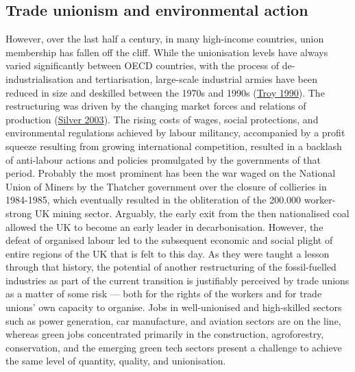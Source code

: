 \documentclass[a4paper, nobind]{templates/ociamthesis}
\begin{document}
\hypertarget{trade-unionism-and-environmental-action}{%
\subsection{Trade unionism and environmental action}\label{trade-unionism-and-environmental-action}}

However, over the last half a century, in many high-income countries, union membership has fallen off the cliff. While the unionisation levels have always varied significantly between OECD countries, with the process of de-industrialisation and tertiarisation, large-scale industrial armies have been reduced in size and deskilled between the 1970s and 1990s (\protect\hyperlink{ref-troy_us_1990}{Troy 1990}). The restructuring was driven by the changing market forces and relations of production (\protect\hyperlink{ref-silver_forces_2003}{Silver 2003}). The rising costs of wages, social protections, and environmental regulations achieved by labour militancy, accompanied by a profit squeeze resulting from growing international competition, resulted in a backlash of anti-labour actions and policies promulgated by the governments of that period. Probably the most prominent has been the war waged on the National Union of Miners by the Thatcher government over the closure of collieries in 1984-1985, which eventually resulted in the obliteration of the 200.000 worker-strong UK mining sector. Arguably, the early exit from the then nationalised coal allowed the UK to become an early leader in decarbonisation. However, the defeat of organised labour led to the subsequent economic and social plight of entire regions of the UK that is felt to this day. As they were taught a lesson through that history, the potential of another restructuring of the fossil-fuelled industries as part of the current transition is justifiably perceived by trade unions as a matter of some risk --- both for the rights of the workers and for trade unions' own capacity to organise. Jobs in well-unionised and high-skilled sectors such as power generation, car manufacture, and aviation sectors are on the line, whereas green jobs concentrated primarily in the construction, agroforestry, conservation, and the emerging green tech sectors present a challenge to achieve the same level of quantity, quality, and unionisation.
\end{document}
